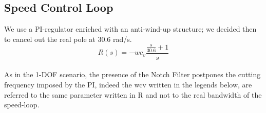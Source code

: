 \newpage 
\subsection{Speed Control Loop}
We use a PI-regulator enriched with an anti-wind-up structure; we decided then to cancel out the real pole at 30.6 rad/s.
\\
\[
R(s)=-wc_v
\frac{\frac{s}{30.6}+1}{s}
\]
\\
As in the 1-DOF scenario, the presence of the Notch Filter postpones the cutting frequency imposed by the PI, indeed the wcv written in the legends below, are referred to the same parameter written in R and not to the real bandwidth of the speed-loop.







